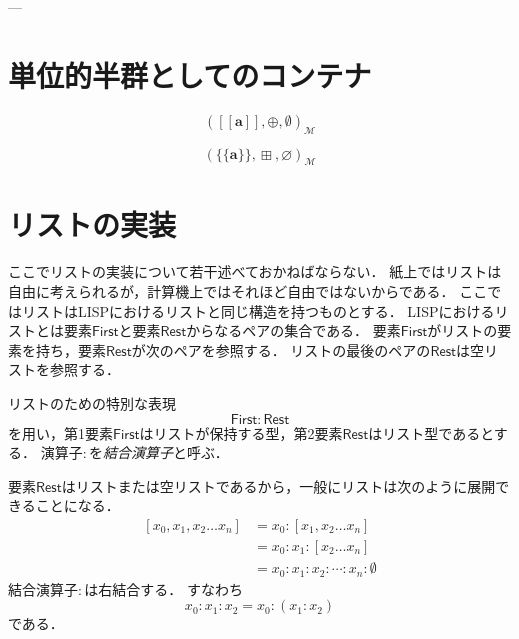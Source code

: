 \documentclass[twocolumn]{jsbook}
\def\[{[\![}
\def\]{]\!]}
\newcommand{\hsklType}[1]{\textbf{#1}}
\DeclareMathOperator{\hsklMaybeAppend}{\boxplus}
\newcommand{\hsklAppend}{\oplus}
\newcommand{\hsklEmptyList}{\emptyset}
\newcommand{\hsklNothing}{\varnothing}
\newcommand{\hsklListType}[1]{\[#1\]}
\newcommand{\hsklMaybeType}[1]{\{\!\{#1\}\!\}}
\newcommand{\mathMonoid}[3]{(#1,#2,#3)_\mathcal{M}}
\newcommand{\keyword}[1]{\emph{#1}}
\newcommand{\typename}[1]{\mathbf{#1}}
\newcommand{\typeconstructor}[2]{\mathop{#1}\,#2}
\newcommand{\typemaybe}{\typename{Maybe}}
\newcommand{\constantempty}{\emptyset}
\newcommand{\constantnothing}{\varnothing}
\newcommand{\binarymaybeappend}{\boxplus}
\newcommand{\binaryconcat}{:}
\newcommand{\listtype}[1]{\left[#1\right]}
\newcommand{\rangedots}{\dots}
\newcommand{\specialwordname}[1]{\mathsf{#1}}
\newcommand{\specialwordfirst}{\specialwordname{First}}
\newcommand{\specialwordrest}{\specialwordname{Rest}}
\begin{document}

---

\section{単位的半群としてのコンテナ}

$$\mathMonoid{\hsklListType{\hsklType{a}}}{\hsklAppend}{\hsklEmptyList}$$

$$\mathMonoid{\hsklMaybeType{\hsklType{a}}}{\hsklMaybeAppend}{\hsklNothing}$$



\section{リストの実装}

ここでリストの実装について若干述べておかねばならない．
紙上ではリストは自由に考えられるが，計算機上ではそれほど自由ではないからである．
ここではリストはLISPにおけるリストと同じ構造を持つものとする．
LISPにおけるリストとは要素$\specialwordfirst$と要素$\specialwordrest$からなるペアの集合である．
要素$\specialwordfirst$がリストの要素を持ち，要素$\specialwordrest$が次のペアを参照する．
リストの最後のペアの$\specialwordrest$は空リストを参照する．

リストのための特別な表現$$\specialwordfirst\binaryconcat\specialwordrest$$を用い，第1要素$\specialwordfirst$はリストが保持する型，第2要素$\specialwordrest$はリスト型であるとする．
演算子$\binaryconcat$を\keyword{結合演算子}と呼ぶ．

要素$\specialwordrest$はリストまたは空リストであるから，一般にリストは次のように展開できることになる．
\begin{align*}
\listtype{x_0,x_1,x_2\rangedots x_n}&=x_0\binaryconcat\listtype{x_1,x_2\rangedots x_n}\\
&=x_0\binaryconcat x_1\binaryconcat\listtype{x_2\rangedots x_n}\\
&=x_0\binaryconcat x_1\binaryconcat x_2\binaryconcat\dotsb\binaryconcat x_n\binaryconcat\constantempty
\end{align*}
結合演算子$\binaryconcat$は右結合する．
すなわち$$x_0\binaryconcat x_1\binaryconcat x_2=x_0\binaryconcat(x_1\binaryconcat x_2)$$である．
\end{document}
